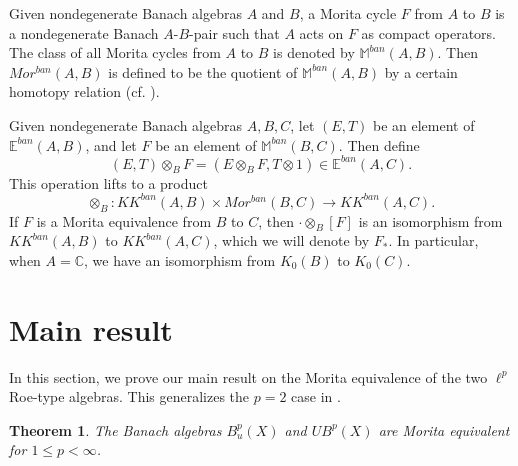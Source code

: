 \documentclass[a4,11pt]{amsart}
\newtheorem{thm}{Theorem}[section]
\theoremstyle{remark}
\begin{document}
Given nondegenerate Banach algebras $A$ and $B$, a Morita cycle $F$ from $A$ to $B$ is a nondegenerate Banach $A$-$B$-pair such that $A$ acts on $F$ as compact operators.
The class of all Morita cycles from $A$ to $B$ is denoted by $\mathbb{M}^{ban}(A,B)$.
Then $Mor^{ban}(A,B)$ is defined to be the quotient of $\mathbb{M}^{ban}(A,B)$ by a certain homotopy relation (cf. \cite[Definition 5.8]{Par09}).

Given nondegenerate Banach algebras $A,B,C$, let $(E,T)$ be an element of $\mathbb{E}^{ban}(A,B)$, and let $F$ be an element of $\mathbb{M}^{ban}(B,C)$.
Then define \[ (E,T)\otimes_B F=(E\otimes_B F,T\otimes 1)\in\mathbb{E}^{ban}(A,C).\]
This operation lifts to a product \[ \otimes_B:KK^{ban}(A,B)\times Mor^{ban}(B,C)\rightarrow KK^{ban}(A,C).\]
If $F$ is a Morita equivalence from $B$ to $C$, then $\cdot\otimes_B[F]$ is an isomorphism from $KK^{ban}(A,B)$ to $KK^{ban}(A,C)$, which we will denote by $F_*$.
In particular, when $A=\mathbb{C}$, we have an isomorphism from $K_0(B)$ to $K_0(C)$.


\section{Main result} \label{sect:main}

In this section, we prove our main result on the Morita equivalence of the two $\ell^p$ Roe-type algebras. This generalizes the $p=2$ case in \cite[Proposition 4.7]{SW13}.

\begin{thm} \label{thm:equivalence}
The Banach algebras $B^p_u(X)$ and $UB^p(X)$ are Morita equivalent for $1\leq p<\infty$.
\end{thm} 
\end{document}
